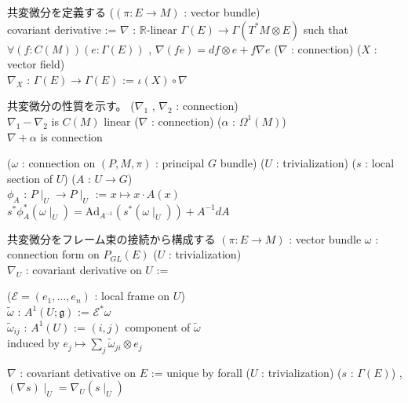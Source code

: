 \begin{Definition}
\itemnote
  共変微分を定義する
\itemdefi
  \For (\((\pi : E \to M)\) : vector bundle) \\
  \Define covariant derivative := \(\nabla\) : \(\mathbb{R}\text{-linear } \Gamma(E) \to \Gamma(T^*M \otimes E)\) such that \(\forall (f : C(M)) (e : \Gamma(E))\) , \(\nabla(f e) = d f \otimes e + f \nabla e\)
\itemdefi
  \For (\(\nabla\) : connection) (\(X\) : vector field) \\
  \Define \(\nabla_X\) : \(\Gamma(E) \to \Gamma(E)\) := \(\iota (X) \circ \nabla\)
\end{Definition}

\begin{Theorem}
\itemnote
  共変微分の性質を示す。
\itemprop
  \For (\(\nabla_1\) , \(\nabla_2\) : connection) \\
  \Then \(\nabla_1 - \nabla_2\) is \(C(M)\) linear
\itemprop
  \For (\(\nabla\) : connection) (\(\alpha\) : \(\Omega^1(M)\)) \\
  \Then \(\nabla + \alpha\) is connection
\end{Theorem}

\begin{Theorem}
\itemnote
  \For (\(\omega\) : connection on \((P , M , \pi)\) : principal \(G\) bundle) (\(U\) : trivialization) (\(s\) : local section of \(U\)) (\(A\) : \(U \to G\)) \\
  \Let \(\phi_A\) : \(P \mid_{U} \to P \mid_{U}\) := \(x \mapsto x \cdot A(x)\) \\
  \Then \(s^* \phi_A^* (\omega \mid_{U}) = \text{Ad}_{A^{-1}} (s^* (\omega \mid_{U})) + A^{-1}dA\)
\end{Theorem}

\begin{Definition}
\itemnote
  共変微分をフレーム束の接続から構成する
\itemwhen
  \Fix \((\pi : E \to M)\) : vector bundle
  \Fix \(\omega\) : connection form on \(P_{GL}(E)\)
\itemdefi
  \For (\(U\) : trivialization) \\
  \Define \(\nabla_U\) : covariant derivative on \(U\) :=
  \begin{indentblock}
    \Take (\(\mathcal{E} = (e_1 , \ldots , e_n)\) : local frame on \(U\)) \\
    \Let \(\tilde{\omega}\) : \(A^1(U ; \mathfrak{g})\) := \(\mathcal{E}^*\omega\) \\
    \Let \(\tilde{\omega}_{ij}\) : \(A^1(U)\) := \((i,j)\) component of \(\tilde{\omega}\) \\
    \Return induced by \(e_j \mapsto \sum_j \tilde{\omega}_{ji} \otimes e_j\)
  \end{indentblock}
\itemdefi
  \Define \(\nabla\) : covariant detivative on \(E\) := unique by forall (\(U\) : trivialization) (\(s\) : \(\Gamma(E)\)) , \((\nabla s) \mid_{U} = \nabla_U (s \mid_U)\)
\end{Definition}

